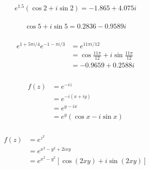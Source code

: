 \documentclass{article}
\begin{document}
\setcounter{subsubsection}{6}
\subsubsection{}

\[e^{1.5} (\cos 2 + i \sin 2) = -1.865 + 4.075 i\]

\setcounter{subsubsection}{8}
\subsubsection{}

\[\cos 5 + i \sin 5 = 0.2836 - 0.9589 i\]

\setcounter{subsubsection}{10}
\subsubsection{}

\begin{align*}
  e^{1 + 5 \pi i / 4} e^{-1 - \pi i / 3} & = e^{11 \pi i / 12}                                 \\
                                         & = \cos \frac{11 \pi}{12} + i \sin \frac{11 \pi}{12} \\
                                         & = -0.9659 + 0.2588 i
\end{align*}

\setcounter{subsubsection}{12}
\subsubsection{}

\begin{align*}
  f(z) & = e^{-i z}                \\
       & = e^{-i (x + i y)}        \\
       & = e^{y - i x}             \\
       & = e^y (\cos x - i \sin x)
\end{align*}

\setcounter{subsubsection}{14}
\subsubsection{}

\begin{align*}
  f(z) & = e^{z^2}                                       \\
       & = e^{x^2 - y^2 + 2 i x y}                       \\
       & = e^{x^2 - y^2} [\cos (2 x y) + i \sin (2 x y)]
\end{align*}
\end{document}
